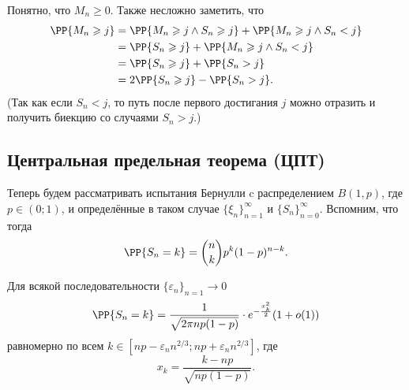 \documentclass[12pt,a4paper]{article}
\begin{document}
    Понятно, что $M_n \geqslant 0$. Также несложно заметить, что
    \begin{align*}
        \PP\{M_n \geqslant j\}
        &= \PP\{M_n \geqslant j \wedge S_n \geqslant j\} + \PP\{M_n \geqslant j \wedge S_n < j\}\\
        &= \PP\{S_n \geqslant j\} + \PP\{M_n \geqslant j \wedge S_n < j\}\\
        &= \PP\{S_n \geqslant j\} + \PP\{S_n > j\}\\
        &= 2\PP\{S_n \geqslant j\} - \PP\{S_n > j\}.
    \end{align*}
    (Так как если $S_n < j$, то путь после первого достигания $j$ можно отразить и получить биекцию со случаями $S_n > j$.)

    \subsection{Центральная предельная теорема (ЦПТ)}

    Теперь будем рассматривать испытания Бернулли c распределением $B(1, p)$, где $p \in (0; 1)$, и определённые в таком случае $\{\xi_n\}_{n=1}^\infty$ и $\{S_n\}_{n=0}^\infty$. Вспомним, что тогда
    \[\PP\{S_n = k\} = \binom{n}{k} p^k (1-p)^{n-k}.\]

    \begin{theorem}
        Для всякой последовательности $\{\varepsilon_n\}_{n=1} \to 0$
        \[\PP\{S_n = k\} = \frac{1}{\sqrt{2\pi n p (1-p)}} \cdot e^{-\frac{x_k^2}{2}} (1 + o(1))\]
        равномерно по всем $k \in [np - \varepsilon_n n^{2/3}; np + \varepsilon_n n^{2/3}]$, где
        \[x_k = \frac{k - np}{\sqrt{np(1-p)}}.\]
    \end{theorem}
\end{document}
